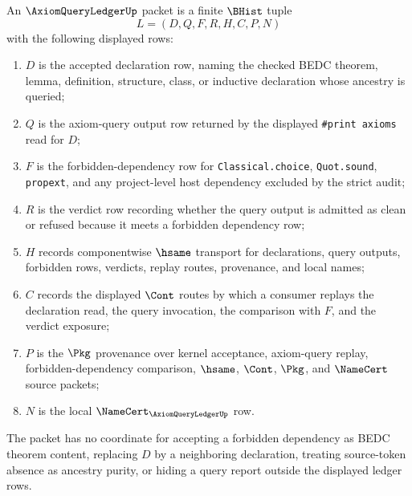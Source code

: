 \begin{definition}
\label{def:axiom-query-ledger-packet}
An $\AxiomQueryLedgerUp$ packet is a finite $\BHist$ tuple
$$
L=(D,Q,F,R,H,C,P,N)
$$
with the following displayed rows:
\begin{enumerate}
\item $D$ is the accepted declaration row, naming the checked BEDC theorem, lemma, definition, structure, class, or inductive declaration whose ancestry is queried;
\item $Q$ is the axiom-query output row returned by the displayed \texttt{\#print axioms} read for $D$;
\item $F$ is the forbidden-dependency row for \texttt{Classical.choice}, \texttt{Quot.sound}, \texttt{propext}, and any project-level host dependency excluded by the strict audit;
\item $R$ is the verdict row recording whether the query output is admitted as clean or refused because it meets a forbidden dependency row;
\item $H$ records componentwise $\hsame$ transport for declarations, query outputs, forbidden rows, verdicts, replay routes, provenance, and local names;
\item $C$ records the displayed $\Cont$ routes by which a consumer replays the declaration read, the query invocation, the comparison with $F$, and the verdict exposure;
\item $P$ is the $\Pkg$ provenance over kernel acceptance, axiom-query replay, forbidden-dependency comparison, $\hsame$, $\Cont$, $\Pkg$, and $\NameCert$ source packets;
\item $N$ is the local $\NameCert_{\AxiomQueryLedgerUp}$ row.
\end{enumerate}
The packet has no coordinate for accepting a forbidden dependency as BEDC theorem content, replacing $D$ by a neighboring declaration, treating source-token absence as ancestry purity, or hiding a query report outside the displayed ledger rows.
\end{definition}

